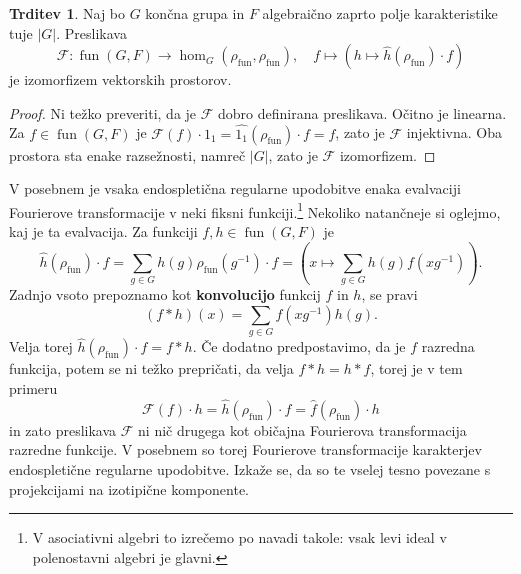 \documentclass[11pt]{book}
\def\Fcal{\mathcal{F}}
\DeclareMathOperator\fun{fun}
\def\definicija{\color{rdeca}\bf}
\theoremstyle{definition}
\theoremstyle{zgled}
\theoremstyle{zgledbrezstevilke}
\theoremstyle{odprtproblem}
\theoremstyle{domacanaloga}
\newenvironment{dokaz}
    {\color{siva}\begin{proof}}
    {\end{proof}}
\theoremstyle{izrek}
\newtheorem{trditev}[theorem]{Trditev}
\begin{document}
\begin{trditev}
Naj bo $G$ končna grupa in $F$ algebraično zaprto polje karakteristike tuje $|G|$. Preslikava
\[
    \Fcal \colon \fun(G,F) \to \hom_G(\rho_{\fun}, \rho_{\fun}), \quad
    f \mapsto \left( h \mapsto \hat{h}(\rho_{\fun}) \cdot f \right)
\]
je izomorfizem vektorskih prostorov.
\end{trditev}
\begin{dokaz}
Ni težko preveriti, da je $\Fcal$ dobro definirana preslikava. Očitno je linearna. Za $f \in \fun(G,F)$ je $\Fcal(f) \cdot 1_1 = \widehat{1_1}(\rho_{\fun}) \cdot f = f$, zato je $\Fcal$ injektivna. Oba prostora sta enake razsežnosti, namreč $|G|$, zato je $\Fcal$ izomorfizem.
\end{dokaz}

V posebnem je vsaka endospletična regularne upodobitve enaka evalvaciji Fourierove transformacije v neki fiksni funkciji.\footnote{V asociativni algebri to izrečemo po navadi takole: vsak levi ideal v polenostavni algebri je glavni.} Nekoliko natančneje si oglejmo, kaj je ta evalvacija. Za funkciji $f,h \in \fun(G,F)$ je
\[
    \hat{h}(\rho_{\fun}) \cdot f = \sum_{g \in G} h(g) \rho_{\fun}(g^{-1}) \cdot f =
    \left( x \mapsto \sum_{g \in G} h(g) f(x g^{-1}) \right).
\]
Zadnjo vsoto prepoznamo kot {\definicija konvolucijo} funkcij $f$ in $h$, se pravi
\[
    \left( f * h \right) (x) = \sum_{g \in G} f(x g^{-1}) h(g).
\]
Velja torej $\hat{h}(\rho_{\fun}) \cdot f = f * h$. Če dodatno predpostavimo, da je $f$ razredna funkcija, potem se ni težko prepričati, da velja $f * h = h * f$, torej je v tem primeru
\[
    \Fcal(f) \cdot h = \hat{h}(\rho_{\fun}) \cdot f = \hat{f}(\rho_{\fun}) \cdot h 
\]
in zato preslikava $\Fcal$ ni nič drugega kot običajna Fourierova transformacija razredne funkcije. V posebnem so torej Fourierove transformacije karakterjev endospletične regularne upodobitve. Izkaže se, da so te vselej tesno povezane s projekcijami na izotipične komponente.
\end{document}
